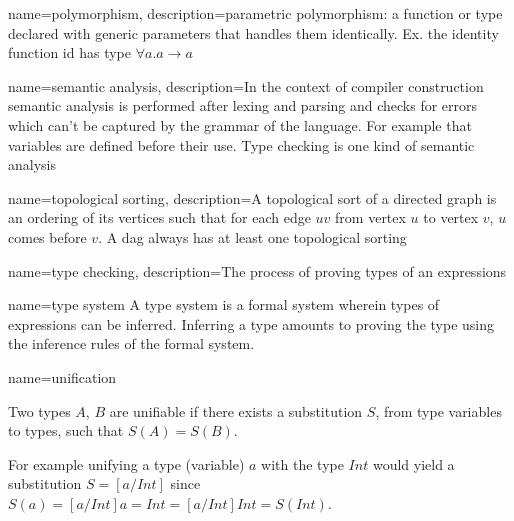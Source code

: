 { name={polymorphism},
  description={parametric polymorphism: a function or type declared with generic parameters that handles them identically. Ex. the identity function id has type $\forall a . a \to a$}
}

{ name={semantic analysis},
  description={In the context of compiler construction semantic analysis is performed after lexing and parsing and checks for errors which can't be captured by the grammar of the language. For example that variables are defined before their use. Type checking is one kind of semantic analysis}
}

{ name={topological sorting},
  description={A topological sort of a directed graph is an ordering of its vertices such that for each edge $uv$ from vertex $u$ to vertex $v$, $u$ comes before $v$. A \acrshort{dag} always has at least one topological sorting}
}

{ name={type checking},
  description={The process of proving types of an expressions}
}

{ name={type system} }
{A type system is a formal system wherein types of expressions can be inferred. Inferring a type amounts to proving the type using the inference rules of the formal system.
}

{ name={unification} }
{Two types $A$, $B$ are unifiable if there exists a substitution $S$, from type variables to types, such that $S(A) = S(B)$.

For example unifying a type (variable) $a$ with the type $Int$ would yield a substitution $S = [a/Int]$ since $S(a) = [a/Int]a = Int = [a/Int]Int = S(Int)$.
}
